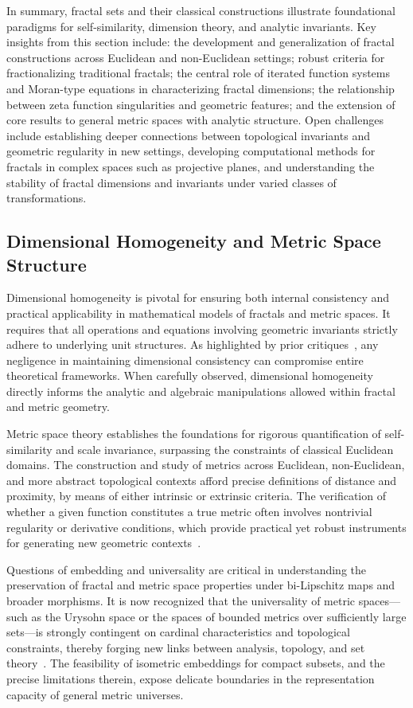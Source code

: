 \documentclass[sigconf]{acmart}
\begin{document}
In summary, fractal sets and their classical constructions illustrate foundational paradigms for self-similarity, dimension theory, and analytic invariants. Key insights from this section include: the development and generalization of fractal constructions across Euclidean and non-Euclidean settings; robust criteria for fractionalizing traditional fractals; the central role of iterated function systems and Moran-type equations in characterizing fractal dimensions; the relationship between zeta function singularities and geometric features; and the extension of core results to general metric spaces with analytic structure. Open challenges include establishing deeper connections between topological invariants and geometric regularity in new settings, developing computational methods for fractals in complex spaces such as projective planes, and understanding the stability of fractal dimensions and invariants under varied classes of transformations.

\subsection{Dimensional Homogeneity and Metric Space Structure}

Dimensional homogeneity is pivotal for ensuring both internal consistency and practical applicability in mathematical models of fractals and metric spaces. It requires that all operations and equations involving geometric invariants strictly adhere to underlying unit structures. As highlighted by prior critiques~\cite{ref61}, any negligence in maintaining dimensional consistency can compromise entire theoretical frameworks. When carefully observed, dimensional homogeneity directly informs the analytic and algebraic manipulations allowed within fractal and metric geometry.

Metric space theory establishes the foundations for rigorous quantification of self-similarity and scale invariance, surpassing the constraints of classical Euclidean domains. The construction and study of metrics across Euclidean, non-Euclidean, and more abstract topological contexts afford precise definitions of distance and proximity, by means of either intrinsic or extrinsic criteria. The verification of whether a given function constitutes a true metric often involves nontrivial regularity or derivative conditions, which provide practical yet robust instruments for generating new geometric contexts~\cite{ref48}.

Questions of embedding and universality are critical in understanding the preservation of fractal and metric space properties under bi-Lipschitz maps and broader morphisms. It is now recognized that the universality of metric spaces—such as the Urysohn space or the spaces of bounded metrics over sufficiently large sets—is strongly contingent on cardinal characteristics and topological constraints, thereby forging new links between analysis, topology, and set theory~\cite{ref50,ref51}. The feasibility of isometric embeddings for compact subsets, and the precise limitations therein, expose delicate boundaries in the representation capacity of general metric universes.
\end{document}
